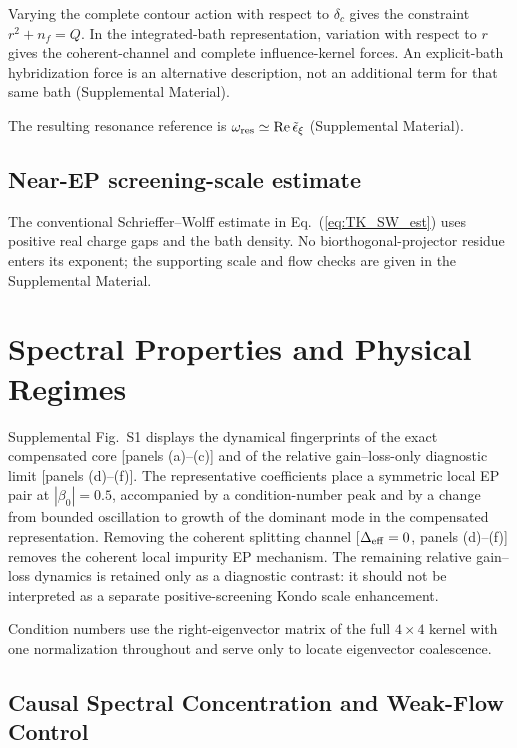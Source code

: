 \documentclass[%
  aps,physrev,onecolumn,10pt,amsmath,amssymb,superscriptaddress,longbibliography,floatfix
]{revtex4-2}
\newcommand{\teps}{\tilde{\epsilon}_{\xi}}
\newcommand{\gb}{\beta_0}               %
\newcommand{\Deff}{\Delta_{\rm eff}}     %
\begin{document}
Varying the complete contour action with respect to $\delta_c$ gives the
constraint $r^2+n_f=Q$.  In the integrated-bath representation, variation
with respect to $r$ gives the coherent-channel and complete influence-kernel
forces.  An explicit-bath hybridization force is an alternative description,
not an additional term for that same bath (Supplemental Material).

The resulting resonance reference is $\omega_{\rm res}\simeq{\rm Re}\,\teps$ (Supplemental Material).

\subsection{Near-EP screening-scale estimate}
The conventional Schrieffer--Wolff estimate in Eq.~(\ref{eq:TK_SW_est}) uses
positive real charge gaps and the bath density.  No biorthogonal-projector
residue enters its exponent; the supporting scale and flow checks are
given in the Supplemental Material.

\section{Spectral Properties and Physical Regimes}
\label{sec:spectra}

Supplemental Fig.~S1 displays the
dynamical fingerprints of the exact compensated core [panels (a)--(c)] and of
the relative gain--loss-only diagnostic limit [panels (d)--(f)].
The representative coefficients place a symmetric local EP pair at $|\gb|=0.5$,
accompanied by a condition-number peak and by a change from bounded
oscillation to growth of the dominant mode in the compensated representation.
Removing the coherent splitting channel [$\Deff=0$, panels (d)--(f)]
removes the coherent local impurity EP mechanism.  The remaining
relative gain--loss dynamics is retained only as a diagnostic contrast:
it should not be interpreted as a separate positive-screening Kondo
scale enhancement.

Condition numbers use the right-eigenvector matrix of the full $4\times4$ kernel with one normalization throughout and serve only to locate eigenvector coalescence.

\subsection{Causal Spectral Concentration and Weak-Flow Control}
\end{document}
